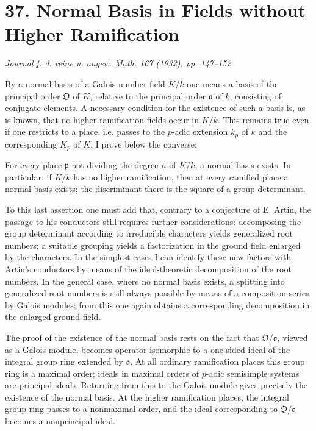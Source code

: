 \documentclass[11pt]{article}
\providecommand{\frakp}{\mathfrak p}
\providecommand{\frako}{\mathfrak o}
\providecommand{\frako}{\mathfrak o}
\providecommand{\frakp}{\mathfrak p}
\providecommand{\frakO}{\mathfrak O}
\providecommand{\frakp}{\mathfrak p}
\begin{document}
\section*{37. Normal Basis in Fields without Higher Ramification}

\begin{center}
\emph{Journal f. d. reine u. angew. Math. 167 (1932), pp. 147--152}
\end{center}

By a normal basis of a Galois number field \(K/k\) one means a basis of the principal order \(\frakO\) of \(K\), relative to the principal order \(\frako\) of \(k\), consisting of conjugate elements. A necessary condition for the existence of such a basis is, as is known, that no higher ramification fields occur in \(K/k\). This remains true even if one restricts to a place, i.e. passes to the \(p\)-adic extension \(k_p\) of \(k\) and the corresponding \(K_p\) of \(K\). I prove below the converse:

For every place \(\frakp\) not dividing the degree \(n\) of \(K/k\), a normal basis exists. In particular: if \(K/k\) has no higher ramification, then at every ramified place a normal basis exists; the discriminant there is the square of a group determinant.

To this last assertion one must add that, contrary to a conjecture of E. Artin, the passage to his conductors still requires further considerations: decomposing the group determinant according to irreducible characters yields generalized root numbers; a suitable grouping yields a factorization in the ground field enlarged by the characters. In the simplest cases I can identify these new factors with Artin's conductors by means of the ideal-theoretic decomposition of the root numbers. In the general case, where no normal basis exists, a splitting into generalized root numbers is still always possible by means of a composition series by Galois modules; from this one again obtains a corresponding decomposition in the enlarged ground field.

The proof of the existence of the normal basis rests on the fact that \(\frakO/\frako\), viewed as a Galois module, becomes operator-isomorphic to a one-sided ideal of the integral group ring extended by \(\frako\). At all ordinary ramification places this group ring is a maximal order; ideals in maximal orders of \(p\)-adic semisimple systems are principal ideals. Returning from this to the Galois module gives precisely the existence of the normal basis. At the higher ramification places, the integral group ring passes to a nonmaximal order, and the ideal corresponding to \(\frakO/\frako\) becomes a nonprincipal ideal.
\end{document}
